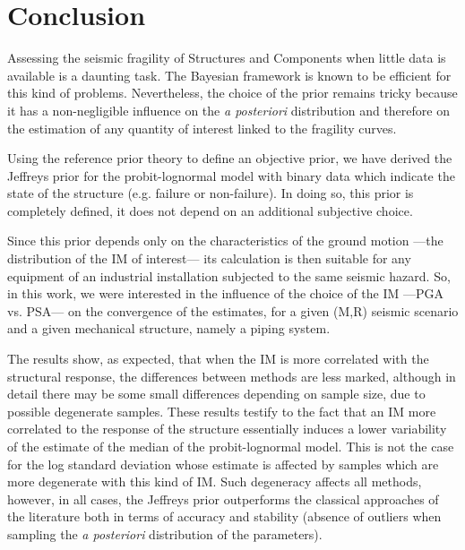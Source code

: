 
\section{Conclusion}  \label{uncIM:sec:conclusion}

Assessing the seismic fragility of Structures and Components when little data is available is a daunting task. The Bayesian framework is known to be efficient for this kind of problems. Nevertheless, the choice of the prior remains tricky because it has a non-negligible influence on the  \emph{a posteriori} distribution and therefore on the estimation of any quantity of interest linked to the fragility curves.

Using the reference prior theory to define an objective prior, we have derived the Jeffreys prior for the probit-lognormal model with binary data which indicate the state of the structure (e.g. failure or non-failure). In doing so, this prior is completely defined, it does not depend on an additional subjective choice.

Since this prior depends only on the characteristics of the ground motion ---the distribution of the IM of interest--- its calculation is then suitable for any equipment of an industrial installation subjected to the same seismic hazard. So, in this work, we were interested in the influence of the choice of the IM ---PGA vs. PSA--- on the convergence of the estimates, for a given (M,R) seismic scenario and a given mechanical structure, namely a piping system.

The results show, as expected, that when the IM is more correlated with the structural response, the differences between methods are less marked, although in detail there may be some small differences depending on sample size, due to possible degenerate samples. {These results testify to the fact that an IM more correlated to the response of the structure essentially induces a lower variability of the estimate of the median of the probit-lognormal model. This is not the case for the log standard deviation whose estimate is affected by samples which are more degenerate with this kind of IM. Such degeneracy affects all methods,} however, in all cases, the Jeffreys prior outperforms the classical approaches of the literature both in terms of accuracy and stability (absence of outliers when sampling the \emph{a posteriori} distribution of the parameters).
